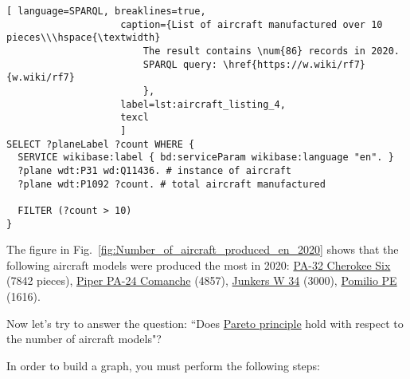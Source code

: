 \begin{lstlisting}[ language=SPARQL, breaklines=true, 
                    caption={List of aircraft manufactured over 10 pieces\\\hspace{\textwidth}
                        The result contains \num{86} records in 2020.
                        SPARQL query: \href{https://w.wiki/rf7}{w.wiki/rf7}
                        },
                    label=lst:aircraft_listing_4,
                    texcl 
                    ]
SELECT ?planeLabel ?count WHERE {
  SERVICE wikibase:label { bd:serviceParam wikibase:language "en". }
  ?plane wdt:P31 wd:Q11436. # instance of aircraft
  ?plane wdt:P1092 ?count. # total aircraft manufactured
  
  FILTER (?count > 10)
}
\end{lstlisting}

The figure in Fig.~\ref{fig:Number_of_aircraft_produced_en_2020} shows that the following aircraft models were produced the most in 
2020: \href{https://www.wikidata.org/wiki/Q2096452}{PA-32 Cherokee Six} (\num{7842} pieces), \href{https://www.wikidata.org/wiki/Q1860367}{Piper PA-24 Comanche} 
(\num{4857}), \href{https://www.wikidata.org/wiki/Q694521}{Junkers W 34} (\num{3000}), \href{https://www.wikidata.org/wiki/Q941011}{Pomilio PE} 
(\num{1616}).

\begin{figure*}[h]

    \setlength{\fboxsep}{0pt}%
    \setlength{\fboxrule}{1pt}%

	\caption{Number of aircraft produced by model, 2020.}%
    \label{fig:Number_of_aircraft_produced_en_2020}%
\end{figure*}

Now let's try to answer the question: ``Does \href{https://en.wikipedia.org/wiki/Pareto_principle}{Pareto principle} hold with respect to the 
number of aircraft models"?

In order to build a graph, you must perform the following steps:


